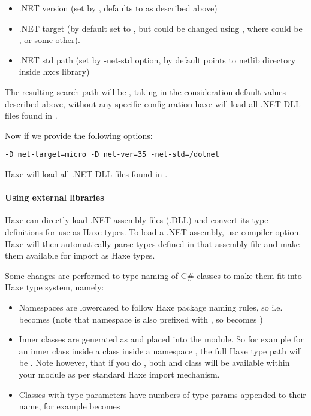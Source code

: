 \begin{itemize}
	\item .NET version (set by , defaults to  as described above)
	\item .NET target (by default set to , but could be changed using , where  could be ,  or some other).
	\item .NET std path (set by -net-std option, by default points to netlib directory inside hxcs library)
\end{itemize}

The resulting search path will be , taking in the consideration default values described above, without any specific configuration haxe will load all .NET DLL files found in .

Now if we provide the following options:

\begin{lstlisting}
-D net-target=micro -D net-ver=35 -net-std=/dotnet
\end{lstlisting}

Haxe will load all .NET DLL files found in .


\paragraph{Using external libraries}

Haxe can directly load .NET assembly files (.DLL) and convert its type definitions for use as Haxe types. To load a .NET assembly, use  compiler option. Haxe will then automatically parse types defined in that assembly file and make them available for import as Haxe types.

Some changes are performed to type naming of C\# classes to make them fit into Haxe type system, namely:

\begin{itemize}
	\item Namespaces are lowercased to follow Haxe package naming rules, so i.e.  becomes  (note that  namespace is also prefixed with , so   becomes  )
	\item Inner classes are generated as  and placed into the  module. So for example for an inner class  inside a class  inside a namespace , the full Haxe type path will be . Note however, that if you do , both  and  class will be available within your module as per standard Haxe import mechanism.
	\item Classes with type parameters have numbers of type params appended to their name, for example  becomes 
\end{itemize}


